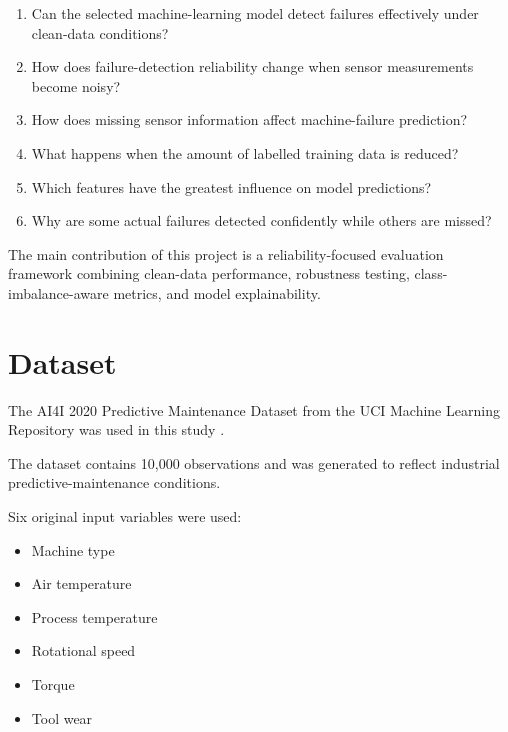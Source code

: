 \documentclass[conference]{IEEEtran}
\begin{document}
\begin{enumerate}

    \item Can the selected machine-learning model detect failures effectively under clean-data conditions?

    \item How does failure-detection reliability change when sensor measurements become noisy?

    \item How does missing sensor information affect machine-failure prediction?

    \item What happens when the amount of labelled training data is reduced?

    \item Which features have the greatest influence on model predictions?

    \item Why are some actual failures detected confidently while others are missed?

\end{enumerate}

The main contribution of this project is a reliability-focused evaluation framework combining clean-data performance, robustness testing, class-imbalance-aware metrics, and model explainability.


\section{Dataset}

The AI4I 2020 Predictive Maintenance Dataset from the UCI Machine Learning Repository was used in this study \cite{uci_ai4i}.

The dataset contains 10,000 observations and was generated to reflect industrial predictive-maintenance conditions.

Six original input variables were used:

\begin{itemize}

    \item Machine type
    \item Air temperature
    \item Process temperature
    \item Rotational speed
    \item Torque
    \item Tool wear

\end{itemize}
\end{document}
